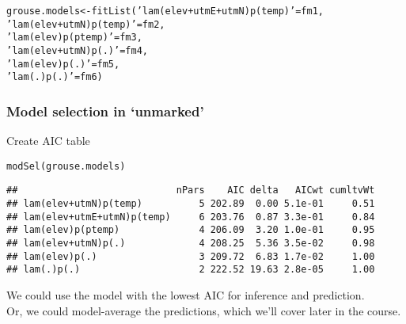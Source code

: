 \documentclass[color=usenames,dvipsnames]{beamer}\usepackage[]{graphicx}\usepackage[]{xcolor}
\makeatletter
\newcommand{\hlstr}[1]{\textcolor[rgb]{0.749,0.012,0.012}{#1}}%
\newcommand{\hlstd}[1]{\textcolor[rgb]{0,0,0}{#1}}%
\newcommand{\hlkwb}[1]{\textcolor[rgb]{0,0.341,0.682}{#1}}%
\newcommand{\hlkwd}[1]{\textcolor[rgb]{0.004,0.004,0.506}{#1}}%
\newenvironment{kframe}{%
 \def\at@end@of@kframe{}%
 \ifinner\ifhmode%
  \def\at@end@of@kframe{\end{minipage}}%
  \begin{minipage}{\columnwidth}%
 \fi\fi%
 \def\FrameCommand##1{\hskip\@totalleftmargin \hskip-\fboxsep
 \colorbox{shadecolor}{##1}\hskip-\fboxsep
     \hskip-\linewidth \hskip-\@totalleftmargin \hskip\columnwidth}%
 \MakeFramed {\advance\hsize-\width
   \@totalleftmargin\z@ \linewidth\hsize
   \@setminipage}}%
 {\par\unskip\endMakeFramed%
 \at@end@of@kframe}
\newenvironment{knitrout}{}{} %
\makeatother
\begin{document}
\begin{frame}[fragile]
\begin{knitrout}
\begin{kframe}
\begin{alltt}
\hlstd{grouse.models} \hlkwb{<-} \hlkwd{fitList}\hlstd{(}\hlstr{'lam(elev+utmE+utmN)p(temp)'}\hlstd{=fm1,}
                         \hlstr{'lam(elev+utmN)p(temp)'}\hlstd{=fm2,}
                         \hlstr{'lam(elev)p(ptemp)'}\hlstd{=fm3,}
                         \hlstr{'lam(elev+utmN)p(.)'}\hlstd{=fm4,}
                         \hlstr{'lam(elev)p(.)'}\hlstd{=fm5,}
                         \hlstr{'lam(.)p(.)'}\hlstd{=fm6)}
\end{alltt}
\end{kframe}
\end{knitrout}
\end{frame}




\begin{frame}[fragile]
  \frametitle{Model selection in `unmarked'}
  \small
  Create AIC table
\begin{knitrout}\scriptsize
{}\color{fgcolor}\begin{kframe}
\begin{alltt}
\hlkwd{modSel}\hlstd{(grouse.models)}
\end{alltt}
\begin{verbatim}
##                            nPars    AIC delta   AICwt cumltvWt
## lam(elev+utmN)p(temp)          5 202.89  0.00 5.1e-01     0.51
## lam(elev+utmE+utmN)p(temp)     6 203.76  0.87 3.3e-01     0.84
## lam(elev)p(ptemp)              4 206.09  3.20 1.0e-01     0.95
## lam(elev+utmN)p(.)             4 208.25  5.36 3.5e-02     0.98
## lam(elev)p(.)                  3 209.72  6.83 1.7e-02     1.00
## lam(.)p(.)                     2 222.52 19.63 2.8e-05     1.00
\end{verbatim}
\end{kframe}
\end{knitrout}
  \pause
  \vfill
  We could use the model with the lowest AIC for inference and
  prediction. \\ 
  \pause
  \vfill
  Or, we could model-average the predictions, which we'll cover later
  in the course. \\
\end{frame}


\end{document}
